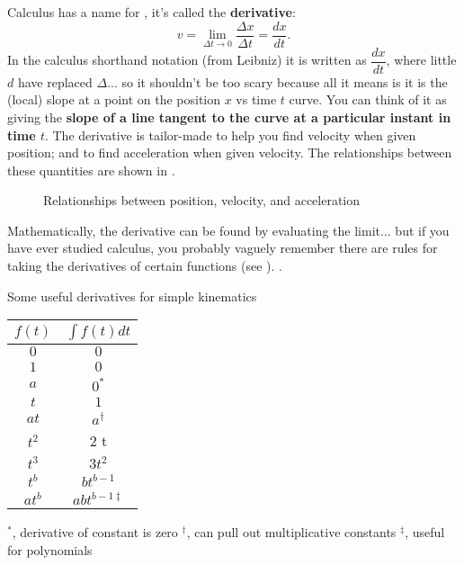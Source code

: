 \documentclass{tufte-handout}
\begin{document}
Calculus has a name for , it's called the \textbf{derivative}:
\begin{equation}
v = \lim_{\Delta t\to 0} \dfrac{\Delta x}{\Delta t} = \dfrac{dx}{dt}.
\label{eq:derivatives3}
\end{equation}
In the calculus shorthand notation (from Leibniz) it is written as $\dfrac{dx}{dt}$, where little $d$ have replaced $\Delta$... so it shouldn't be too scary because all it means is it is the (local) slope at a point on the position $x$ vs time $t$ curve. You can think of it as giving the \textbf{slope of a line tangent to the curve at a particular instant in time $t$}. The derivative is tailor-made to help you find velocity when given position; and to find acceleration when given velocity. The relationships between these quantities are shown in .
\begin{figure}
\caption{Relationships between position, velocity, and acceleration}
\label{fig:derivatives1}
\end{figure}
Mathematically, the derivative can be found by evaluating the limit... but if you have ever studied calculus, you probably vaguely remember there are rules for taking the derivatives of certain functions (see ). . 
\begin{margintable}
\caption{Some useful derivatives for simple kinematics}
\label{tab:derivatives}
\begin{center}
\small
\begin{tabular}{cc}
\toprule
$f(t)$ & $\int f(t) dt$ \\
\midrule
$0$ & $0$ \\
$1$ & $0$ \\
$a$ & $0^*$\\
$t$ & $1$ \\
$at$ & $a^\dag$\\
$t^2$ & $2$ t \\
$t^3$ & $3 t^2$ \\
$t^b$ & $b t^{b-1}$ \\
$at^b$ & $a b t^{b-1 \ddag}$\\
\bottomrule
\end{tabular}
\end{center}
\scriptsize
$^*$, derivative of constant is zero
$^\dag$, can pull out multiplicative constants
$^\ddag$, useful for polynomials  
\end{margintable}
\end{document}
